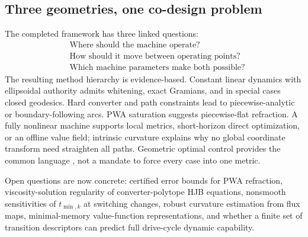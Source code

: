 \subsection{Three geometries, one co-design problem}



The completed framework has three linked questions:
\[
 \boxed{\begin{aligned}
 &\text{Where should the machine operate?}\\
 &\text{How should it move between operating points?}\\
 &\text{Which machine parameters make both possible?}
 \end{aligned}}
 \tag{34.4}
\]
The resulting method hierarchy is evidence-based.  Constant linear dynamics
with ellipsoidal authority admits whitening, exact Gramians, and in special
cases closed geodesics.  Hard converter and path constraints lead to
piecewise-analytic or boundary-following arcs.  PWA saturation suggests
piecewise-flat refraction.  A fully nonlinear machine supports local metrics,
short-horizon direct optimization, or an offline value field; intrinsic
curvature explains why no global coordinate transform need straighten all
paths.  Geometric optimal control provides the common language
\parencite{agrachev2004}, not a mandate to force every case into one metric.

Open questions are now concrete: certified error bounds for PWA refraction,
viscosity-solution regularity of converter-polytope HJB equations, nonsmooth
sensitivities of \(t_{\min,k}\) at switching changes, robust curvature
estimation from flux maps, minimal-memory value-function representations, and
whether a finite set of transition descriptors can predict full drive-cycle
dynamic capability.

